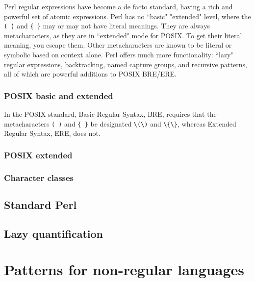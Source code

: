 Perl regular expressions have become a de facto standard, having a rich and powerful set of atomic expressions. Perl has no ``basic" "extended" level, where the \texttt{( )} and \texttt{\{ \}} may or may not have literal meanings. They are always metacharacters, as they are in ``extended" mode for POSIX. To get their literal meaning, you escape them. Other metacharacters are known to be literal or symbolic based on context alone. Perl offers much more functionality: ``lazy" regular expressions, backtracking, named capture groups, and recursive patterns, all of which are powerful additions to POSIX BRE/ERE.



\subsection{POSIX basic and extended}

In the POSIX standard, Basic Regular Syntax, BRE, requires that the metacharacters \texttt{( )} and \texttt{\{ \}} be designated \texttt{\textbackslash(\textbackslash)} and \texttt{\textbackslash\{\textbackslash\}}, whereas Extended Regular Syntax, ERE, does not.


\subsection{POSIX extended}




\subsection{Character classes}



\section{Standard Perl}




\section{Lazy quantification}







\chapter{Patterns for non-regular languages}






